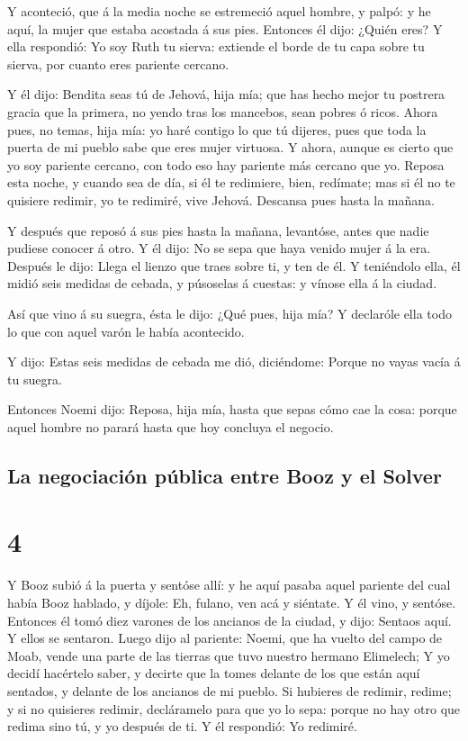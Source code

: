  Y aconteció, que á la media noche se estremeció aquel
hombre, y palpó: y he aquí, la mujer que estaba acostada á sus pies.
 Entonces él dijo: ¿Quién eres? Y ella respondió: Yo soy
Ruth tu sierva: extiende el borde de tu capa sobre tu sierva, por cuanto
eres pariente cercano.

 Y él dijo: Bendita seas tú de Jehová, hija mía; que has
hecho mejor tu postrera gracia que la primera, no yendo tras los
mancebos, sean pobres ó ricos.  Ahora pues, no temas,
hija mía: yo haré contigo lo que tú dijeres, pues que toda la puerta de
mi pueblo sabe que eres mujer virtuosa.  Y ahora, aunque
es cierto que yo soy pariente cercano, con todo eso hay pariente más
cercano que yo.  Reposa esta noche, y cuando sea de día,
si él te redimiere, bien, redímate; mas si él no te quisiere redimir, yo
te redimiré, vive Jehová. Descansa pues hasta la mañana.

 Y después que reposó á sus pies hasta la mañana,
levantóse, antes que nadie pudiese conocer á otro. Y él dijo: No se sepa
que haya venido mujer á la era.  Después le dijo: Llega
el lienzo que traes sobre ti, y ten de él. Y teniéndolo ella, él midió
seis medidas de cebada, y púsoselas á cuestas: y vínose ella á la
ciudad.

 Así que vino á su suegra, ésta le dijo: ¿Qué pues, hija
mía? Y declaróle ella todo lo que con aquel varón le había acontecido.

 Y dijo: Estas seis medidas de cebada me dió, diciéndome:
Porque no vayas vacía á tu suegra.

 Entonces Noemi dijo: Reposa, hija mía, hasta que sepas
cómo cae la cosa: porque aquel hombre no parará hasta que hoy concluya
el negocio.

\hypertarget{la-negociaciuxf3n-puxfablica-entre-booz-y-el-solver}{%
\subsection{La negociación pública entre Booz y el
Solver}\label{la-negociaciuxf3n-puxfablica-entre-booz-y-el-solver}}

\hypertarget{section-3}{%
\section{4}\label{section-3}}

 Y Booz subió á la puerta y sentóse allí: y he aquí pasaba
aquel pariente del cual había Booz hablado, y díjole: Eh, fulano, ven
acá y siéntate. Y él vino, y sentóse.  Entonces él tomó
diez varones de los ancianos de la ciudad, y dijo: Sentaos aquí. Y ellos
se sentaron.  Luego dijo al pariente: Noemi, que ha vuelto
del campo de Moab, vende una parte de las tierras que tuvo nuestro
hermano Elimelech;  Y yo decidí hacértelo saber, y decirte
que la tomes delante de los que están aquí sentados, y delante de los
ancianos de mi pueblo. Si hubieres de redimir, redime; y si no quisieres
redimir, decláramelo para que yo lo sepa: porque no hay otro que redima
sino tú, y yo después de ti. Y él respondió: Yo redimiré.

